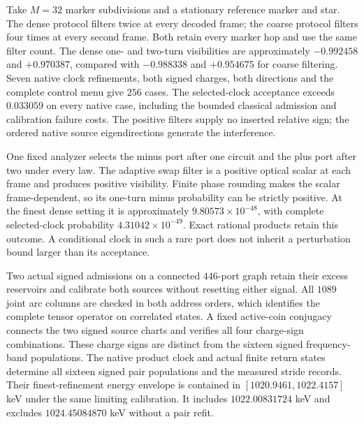 Take $M=32$ marker subdivisions and a stationary reference marker and star.
The dense protocol filters twice at every decoded frame; the coarse protocol
filters four times at every second frame. Both retain every marker hop and
use the same filter count. The dense one- and two-turn visibilities are
approximately $-0.992458$ and $+0.970387$, compared with $-0.988338$ and
$+0.954675$ for coarse filtering. Seven native clock refinements, both signed
charges, both directions and the complete control menu give $256$ cases.
The selected-clock acceptance exceeds $0.033059$ on every native case,
including the bounded classical admission and calibration failure costs.
The positive filters supply no inserted relative sign; the ordered native
source eigendirections generate the interference.

One fixed analyzer selects the minus port after one circuit and the plus
port after two under every law. The adaptive swap filter is a positive
optical scalar at each frame and produces positive visibility. Finite phase
rounding makes the scalar frame-dependent, so its one-turn minus probability
can be strictly positive. At the finest dense setting it is approximately
$9.80573\times10^{-48}$, with complete selected-clock probability
$4.31042\times10^{-49}$. Exact rational products retain this outcome.
A conditional clock in such a rare port does not inherit a perturbation
bound larger than its acceptance.

Two actual signed admissions on a connected $446$-port graph retain their
excess reservoirs and calibrate both sources without resetting either
signal. All $1089$ joint arc columns are checked in both address orders,
which identifies the complete tensor operator on correlated states.
A fixed active-coin conjugacy connects the two signed source charts and
verifies all four charge-sign combinations. These charge signs are distinct
from the sixteen signed frequency-band populations. The native product clock and actual finite return states determine all
sixteen signed pair populations and the measured stride records. Their
finest-refinement energy envelope is contained in
$[1020.9461,1022.4157]$ keV under the same limiting calibration. It includes
$1022.00831724$ keV and excludes $1024.45084870$ keV without a pair refit.

